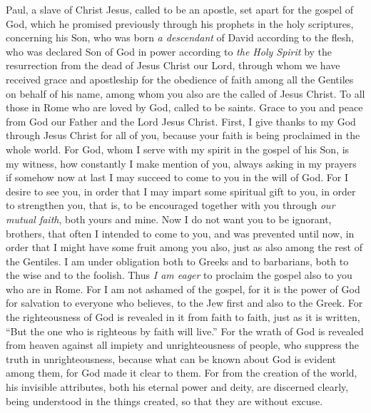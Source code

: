 
\begin{biblechapter} %
 Paul, a slave of Christ Jesus, called to be an apostle, set apart for the gospel of God,
\verse which he promised previously through his prophets in the holy scriptures,
\verse concerning his Son, who was born \textit{a descendant} of David according to the flesh,
\verse who was declared Son of God in power according to \textit{the Holy Spirit} by the resurrection from the dead of Jesus Christ our Lord,
\verse through whom we have received grace and apostleship for the obedience of faith among all the Gentiles on behalf of his name,
\verse among whom you also are the called of Jesus Christ.
\verse To all those in Rome who are loved by God, called to be saints. Grace to you and peace from God our Father and the Lord Jesus Christ.
 First, I give thanks to my God through Jesus Christ for all of you, because your faith is being proclaimed in the whole world.
\verse For God, whom I serve with my spirit in the gospel of his Son, is my witness, how constantly I make mention of you,
\verse always asking in my prayers if somehow now at last I may succeed to come to you in the will of God.
\verse For I desire to see you, in order that I may impart some spiritual gift to you, in order to strengthen you,
\verse that is, to be encouraged together with you through \textit{our mutual faith}, both yours and mine.
\verse Now I do not want you to be ignorant, brothers, that often I intended to come to you, and was prevented until now, in order that I might have some fruit among you also, just as also among the rest of the Gentiles.
\verse I am under obligation both to Greeks and to barbarians, both to the wise and to the foolish.
\verse Thus \textit{I am eager} to proclaim the gospel also to you who are in Rome.
 For I am not ashamed of the gospel, for it is the power of God for salvation to everyone who believes, to the Jew first and also to the Greek.
\verse For the righteousness of God is revealed in it from faith to faith, just as it is written, “But the one who is righteous by faith will live.”
 For the wrath of God is revealed from heaven against all impiety and unrighteousness of people, who suppress the truth in unrighteousness,
\verse because what can be known about God is evident among them, for God made it clear to them.
\verse For from the creation of the world, his invisible attributes, both his eternal power and deity, are discerned clearly, being understood in the things created, so that they are without excuse.

\end{biblechapter}
